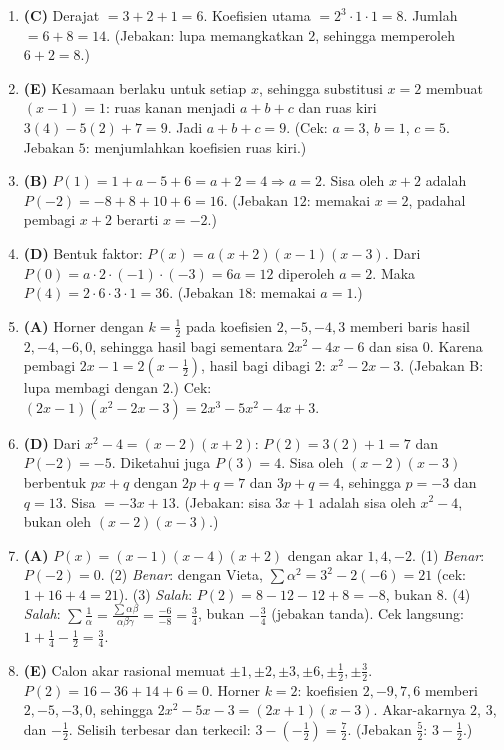 \documentclass[a4paper,11pt]{article}
\newcommand{\dis}{\displaystyle}
\begin{document}
\small\begin{enumerate}[leftmargin=2em,itemsep=2pt,topsep=2pt]
\item[\textbf{1.}] \textbf{(C)} Derajat $=3+2+1=6$. Koefisien utama $=2^3\cdot1\cdot1=8$. Jumlah $=6+8=14$. (Jebakan: lupa memangkatkan $2$, sehingga memperoleh $6+2=8$.)
\item[\textbf{2.}] \textbf{(E)} Kesamaan berlaku untuk setiap $x$, sehingga substitusi $x=2$ membuat $(x-1)=1$: ruas kanan menjadi $a+b+c$ dan ruas kiri $3(4)-5(2)+7=9$. Jadi $a+b+c=9$. (Cek: $a=3$, $b=1$, $c=5$. Jebakan $5$: menjumlahkan koefisien ruas kiri.)
\item[\textbf{3.}] \textbf{(B)} $P(1)=1+a-5+6=a+2=4\Rightarrow a=2$. Sisa oleh $x+2$ adalah $P(-2)=-8+8+10+6=16$. (Jebakan $12$: memakai $x=2$, padahal pembagi $x+2$ berarti $x=-2$.)
\item[\textbf{4.}] \textbf{(D)} Bentuk faktor: $P(x)=a(x+2)(x-1)(x-3)$. Dari $P(0)=a\cdot2\cdot(-1)\cdot(-3)=6a=12$ diperoleh $a=2$. Maka $P(4)=2\cdot6\cdot3\cdot1=36$. (Jebakan $18$: memakai $a=1$.)
\item[\textbf{5.}] \textbf{(A)} Horner dengan $k=\frac12$ pada koefisien $2,-5,-4,3$ memberi baris hasil $2,-4,-6,0$, sehingga hasil bagi sementara $2x^2-4x-6$ dan sisa $0$. Karena pembagi $2x-1=2\left(x-\frac12\right)$, hasil bagi dibagi $2$: $x^2-2x-3$. (Jebakan B: lupa membagi dengan $2$.) Cek: $(2x-1)(x^2-2x-3)=2x^3-5x^2-4x+3$.
\item[\textbf{6.}] \textbf{(D)} Dari $x^2-4=(x-2)(x+2)$: $P(2)=3(2)+1=7$ dan $P(-2)=-5$. Diketahui juga $P(3)=4$. Sisa oleh $(x-2)(x-3)$ berbentuk $px+q$ dengan $2p+q=7$ dan $3p+q=4$, sehingga $p=-3$ dan $q=13$. Sisa $=-3x+13$. (Jebakan: sisa $3x+1$ adalah sisa oleh $x^2-4$, bukan oleh $(x-2)(x-3)$.)
\item[\textbf{7.}] \textbf{(A)} $P(x)=(x-1)(x-4)(x+2)$ dengan akar $1,4,-2$. (1) \emph{Benar}: $P(-2)=0$. (2) \emph{Benar}: dengan Vieta, $\sum\alpha^2=3^2-2(-6)=21$ (cek: $1+16+4=21$). (3) \emph{Salah}: $P(2)=8-12-12+8=-8$, bukan $8$. (4) \emph{Salah}: $\dis\sum\frac1\alpha=\frac{\sum\alpha\beta}{\alpha\beta\gamma}=\frac{-6}{-8}=\frac34$, bukan $-\frac34$ (jebakan tanda). Cek langsung: $1+\frac14-\frac12=\frac34$.
\item[\textbf{8.}] \textbf{(E)} Calon akar rasional memuat $\pm1,\pm2,\pm3,\pm6,\pm\frac12,\pm\frac32$. $P(2)=16-36+14+6=0$. Horner $k=2$: koefisien $2,-9,7,6$ memberi $2,-5,-3,0$, sehingga $2x^2-5x-3=(2x+1)(x-3)$. Akar-akarnya $2$, $3$, dan $-\frac12$. Selisih terbesar dan terkecil: $3-\left(-\frac12\right)=\frac72$. (Jebakan $\frac52$: $3-\frac12$.)

\end{enumerate}
\end{document}
